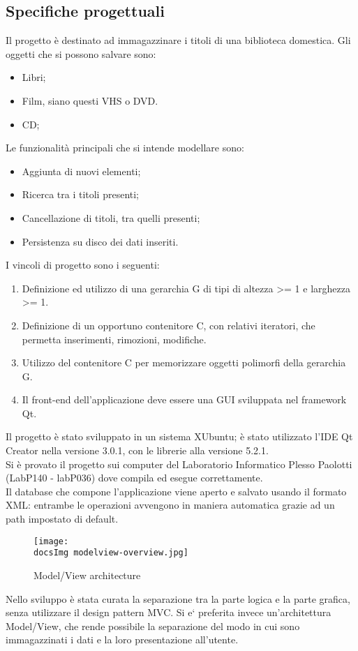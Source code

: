 {	\subsection{Specifiche progettuali}{
		Il progetto è destinato ad immagazzinare i titoli di una biblioteca domestica. Gli oggetti che si possono salvare sono:
		\begin{itemize}\itemsep0.5pt
			\item Libri;
			\item Film, siano questi  VHS o DVD.
			\item CD;
		\end{itemize}
		Le funzionalità principali che si intende modellare sono:
		\begin{itemize}\itemsep0.5pt
			\item Aggiunta di nuovi elementi;
			\item Ricerca tra i titoli presenti;
			\item Cancellazione di titoli, tra quelli presenti;
			\item Persistenza su disco dei dati inseriti.
		\end{itemize}
		I vincoli di progetto sono i seguenti:
		\begin{enumerate}\itemsep0.5pt
			\item Definizione ed utilizzo di una gerarchia G di tipi di altezza >= 1 e larghezza >= 1.
			\item Definizione di un opportuno contenitore C, con relativi iteratori, che permetta inserimenti, rimozioni, modifiche.
			\item Utilizzo del contenitore C per memorizzare oggetti polimorfi della gerarchia G.
			\item Il front-end dell’applicazione deve essere una GUI sviluppata nel framework Qt.
		\end{enumerate}
		Il progetto è stato sviluppato in un sistema XUbuntu; è stato utilizzato l'IDE Qt Creator nella versione 3.0.1, con le librerie alla versione 5.2.1.	\\
		Si è provato il progetto sui computer del Laboratorio Informatico Plesso Paolotti (LabP140 - labP036) dove compila ed esegue correttamente.\\
		Il database che compone l'applicazione viene aperto e salvato usando il formato XML: entrambe le operazioni avvengono in maniera automatica grazie ad un path impostato di default. \\
	
	\begin{figure}[h]
		\begin{center}
			\texttt{[image: \\docsImg modelview-overview.jpg]}
			\caption{Model/View architecture}
		\end{center}
	\end{figure}
		Nello sviluppo è stata curata la separazione tra la parte logica e la parte grafica, senza utilizzare il design pattern MVC. Si e` preferita invece un'architettura Model/View, che rende possibile la separazione del modo in cui sono immagazzinati i dati e la loro presentazione all'utente. %
	}
}